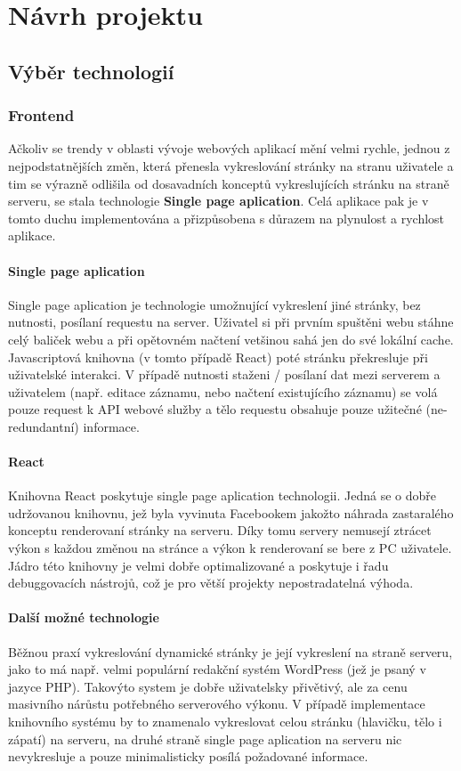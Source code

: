 \chapter{Návrh projektu}

\section{Výběr technologií}

\subsection{Frontend}
Ačkoliv se trendy v oblasti vývoje webových aplikací mění velmi rychle,
jednou z nejpodstatnějších změn, která přenesla vykreslování stránky
na stranu uživatele a tim se výrazně odlišila od dosavadních konceptů
vykreslujících stránku na straně serveru, se stala technologie
\textbf{Single page aplication}. Celá aplikace pak je v tomto duchu
implementována a přizpůsobena s důrazem na plynulost a rychlost aplikace.

\subsubsection{Single page aplication}
Single page aplication je technologie umožnující vykreslení jiné stránky,
bez nutnosti, posílaní requestu na server.
Uživatel si při prvním spuštěni webu stáhne celý baliček webu a 
při opětovném načtení vetšinou sahá jen do své lokální cache.
Javascriptová knihovna (v tomto případě React)
poté stránku překresluje při uživatelské interakci.
V případě nutnosti staženi / posílaní dat mezi serverem a uživatelem
(např. editace záznamu, nebo načtení existujícího záznamu)
se volá pouze request k API webové služby a tělo requestu obsahuje pouze
užitečné (ne-redundantní) informace. 


\subsubsection{React}
Knihovna React poskytuje single page aplication technologii.
Jedná se o dobře udržovanou knihovnu, jež byla vyvinuta Facebookem 
jakožto náhrada zastaralého konceptu renderovaní stránky na serveru.
Díky tomu servery nemusejí ztrácet výkon s každou změnou na stránce a
výkon k renderovaní se bere z PC uživatele.
Jádro této knihovny je velmi dobře optimalizované a poskytuje i řadu
debuggovacích nástrojů, což je pro větší projekty nepostradatelná výhoda.  


\subsubsection{Další možné technologie}
Běžnou praxí vykreslování dynamické stránky je její vykreslení na straně serveru,
jako to má např. velmi populární redakční systém WordPress (jež je psaný v jazyce PHP).
Takovýto system je dobře uživatelsky přivětivý, ale za cenu masivního nárůstu
potřebného serverového výkonu.
V případě implementace knihovního systému by to znamenalo vykreslovat
celou stránku (hlavičku, tělo i zápatí) na serveru,
na druhé straně single page aplication na serveru nic nevykresluje a
pouze minimalisticky posílá požadované informace.


